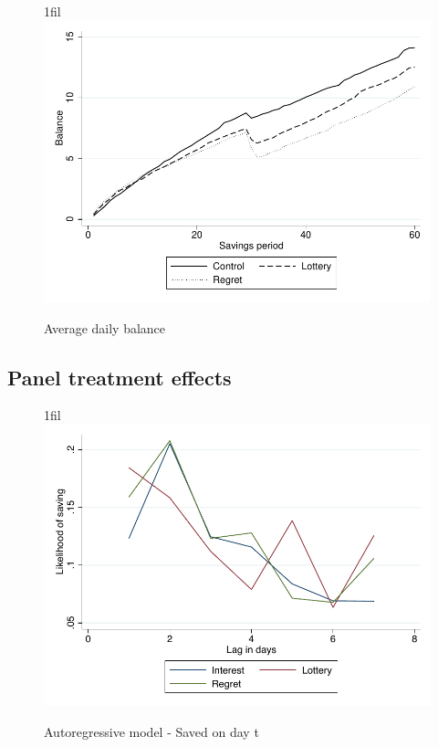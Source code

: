 \documentclass[10pt]{article}
\makeatletter
\newcommand*{\centerfloat}{%
  \parindent \z@
  \leftskip \z@ \@plus 1fil \@minus \textwidth
  \rightskip\leftskip
  \parfillskip \z@skip}
\makeatother
\begin{document}
		\begin{figure}[!htb]
		\centering
		\caption{Average daily balance}
		\centerfloat
		\includegraphics{../../figures/line-balance.pdf}
		\end{figure}

	\clearpage

	\subsection{Panel treatment effects}

		\begin{figure}[!htb]
		\centering
		\caption{Autoregressive model - Saved on day t}
		\centerfloat
		\includegraphics{../../figures/line-ar.pdf}
		\end{figure}
\end{document}
